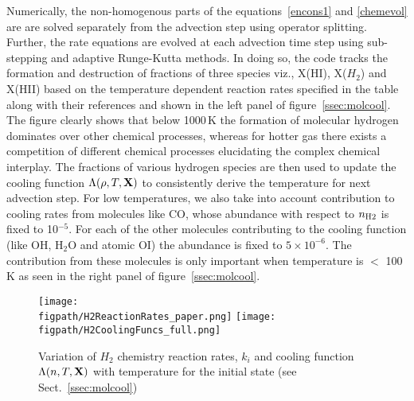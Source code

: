 \documentclass[useAMS,usenatbib]{mn2e}
\newcommand{\figpath}{/Users/bhargavvaidya/MyProject/work/Leeds_Uni/SiOJets_New/PAPER/PFIGS/}
\begin{document}
Numerically, the
non-homogenous parts of the equations~\ref{encons1} and \ref{chemevol} 
are are solved separately from the advection step
using operator splitting. Further, the rate equations are evolved at each advection time
step using sub-stepping and adaptive Runge-Kutta methods.
In doing so, the code tracks the formation and destruction of
fractions of three species viz., X(HI), X($H_{2}$)
and X(HII) based on the temperature dependent reaction rates specified
in the table along with their references and shown in the left panel
of figure~\ref{ssec:molcool}. The figure clearly shows that below
1000\,K the formation of molecular hydrogen dominates over other
chemical processes, whereas for hotter gas there exists a competition
of different chemical processes elucidating the complex chemical interplay.
The fractions of various hydrogen species are then used to update the cooling
function $\Lambda(\rho,T,{\bf{X}})$ to consistently derive the
temperature for next advection step. For low temperatures, we also
take into account contribution to cooling rates from molecules like
CO, whose abundance with respect to $n_{\rm H2}$ is fixed to
10$^{-5}$. For each of the other molecules contributing to the cooling function (like OH, H$_{2}$O and atomic OI)
the abundance is fixed to $5\times10^{-6}$. The contribution from
these molecules is only important when temperature is $<$ 100\,K as seen
in the right panel of figure~\ref{ssec:molcool}. 



\begin{figure*}
 \texttt{[image: \\figpath/H2ReactionRates\_paper.png]}
 \texttt{[image: \\figpath/H2CoolingFuncs\_full.png]}
 \caption{Variation of $H_2$ chemistry reaction rates, $k_{i}$ and cooling
   function $\Lambda(n,T,{\bf{X}})$ with temperature for the initial
   state (see Sect.~\ref{ssec:molcool})}
\label{fig:tempvar}
\end{figure*}
\end{document}
